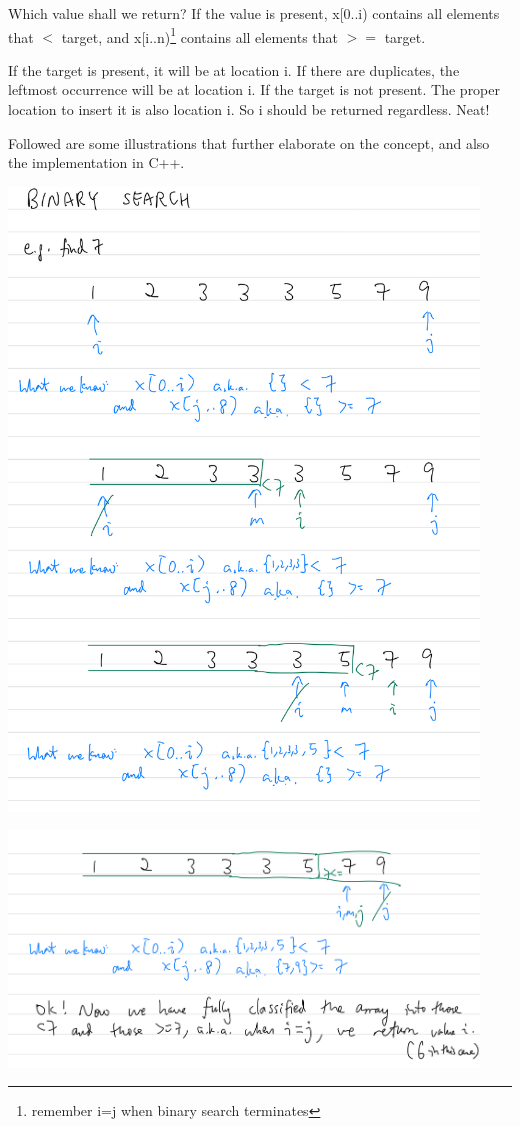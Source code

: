 Which value shall we return? If the value is present, x[0..i) contains all elements that $<$ target, and x[i..n)\footnote{remember i=j when binary search terminates} contains all elements that $>=$ target. 

If the target is present, it will be at location i. If there are duplicates, the leftmost occurrence will be at location i. If the target is not present. The proper location to insert it is also location i. So i should be returned regardless. Neat!

Followed are some illustrations that further elaborate on the concept, and also the implementation in C++.
\vspace{6mm}

\includegraphics[width=12.5cm]{images/ch7-binarysearch71.png}

\includegraphics[width=12.5cm]{images/ch7-binarysearch72.png}

